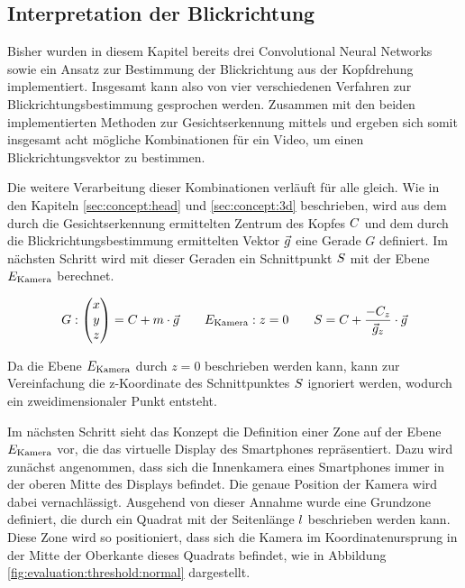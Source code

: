 \subsection{Interpretation der Blickrichtung}\label{sec:implementation:gaze:interpretation}

Bisher wurden in diesem Kapitel bereits drei Convolutional Neural Networks sowie ein Ansatz zur Bestimmung der Blickrichtung aus der Kopfdrehung implementiert. Insgesamt kann also von vier verschiedenen Verfahren zur Blickrichtungsbestimmung gesprochen werden. Zusammen mit den beiden implementierten Methoden zur Gesichtserkennung mittels \dlib und \mediapipe ergeben sich somit insgesamt acht mögliche Kombinationen für ein Video, um einen Blickrichtungsvektor zu bestimmen.

Die weitere Verarbeitung dieser Kombinationen verläuft für alle gleich. Wie in den Kapiteln \ref{sec:concept:head} und \ref{sec:concept:3d} beschrieben, wird aus dem durch die Gesichtserkennung ermittelten Zentrum des Kopfes $C$ und dem durch die Blickrichtungsbestimmung ermittelten Vektor $\vec{g}$ eine Gerade $G$ definiert. Im nächsten Schritt wird mit dieser Geraden ein Schnittpunkt $S$ mit der Ebene $E_{\text{Kamera}}$ berechnet.

\[G: \begin{pmatrix}
    x \\ y \\ z 
\end{pmatrix}= C + m \cdot \vec{g}\qquad E_{\text{Kamera}}: z = 0\qquad S= C + \frac{-C_z}{\vec{g}_z} \cdot \vec{g}
\]

Da die Ebene $E_{\text{Kamera}}$ durch $z = 0$ beschrieben werden kann, kann zur Vereinfachung die z-Koordinate des Schnittpunktes $S$ ignoriert werden, wodurch ein zweidimensionaler Punkt entsteht. 

Im nächsten Schritt sieht das Konzept die Definition einer Zone auf der Ebene $E_{\text{Kamera}}$ vor, die das virtuelle Display des Smartphones repräsentiert. Dazu wird zunächst angenommen, dass sich die Innenkamera eines Smartphones immer in der oberen Mitte des Displays befindet. Die genaue Position der Kamera wird dabei vernachlässigt. Ausgehend von dieser Annahme wurde eine Grundzone definiert, die durch ein Quadrat mit der Seitenlänge $l$ beschrieben werden kann. Diese Zone wird so positioniert, dass sich die Kamera im Koordinatenursprung in der Mitte der Oberkante dieses Quadrats befindet, wie in Abbildung \ref{fig:evaluation:threshold:normal} dargestellt.

